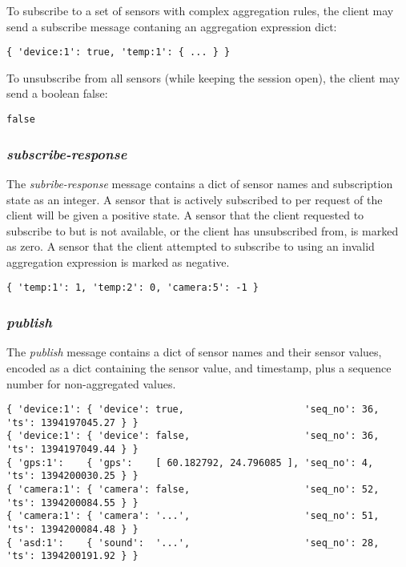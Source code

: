 \documentclass[a4paper]{article}
\begin{document}
To subscribe to a set of sensors with complex aggregation rules, the client may send a subscribe message contaning an aggregation expression dict:
\begin{verbatim}
{ 'device:1': true, 'temp:1': { ... } }
\end{verbatim}

To unsubscribe from all sensors (while keeping the session open), the client may send a boolean false:
\begin{verbatim}
false
\end{verbatim}

\subsubsection{\emph{subscribe-response}}
The \emph{subribe-response} message contains a dict of sensor names and subscription state as an integer. A sensor that is actively subscribed to per request of the client will be given a positive state. A sensor that the client requested to subscribe to but is not available, or the client has unsubscribed from, is marked as zero. A sensor that the client attempted to subscribe to using an invalid aggregation expression is marked as negative.

\begin{verbatim}
{ 'temp:1': 1, 'temp:2': 0, 'camera:5': -1 }
\end{verbatim}

\subsubsection{\emph{publish}}

The \emph{publish} message contains a dict of sensor names and their sensor values, encoded as a dict containing the sensor value, and timestamp, plus a sequence number for non-aggregated values.
\begin{verbatim}
{ 'device:1': { 'device': true,                     'seq_no': 36, 'ts': 1394197045.27 } }
{ 'device:1': { 'device': false,                    'seq_no': 36, 'ts': 1394197049.44 } }
{ 'gps:1':    { 'gps':    [ 60.182792, 24.796085 ], 'seq_no': 4,  'ts': 1394200030.25 } }
{ 'camera:1': { 'camera': false,                    'seq_no': 52, 'ts': 1394200084.55 } }
{ 'camera:1': { 'camera': '...',                    'seq_no': 51, 'ts': 1394200084.48 } }
{ 'asd:1':    { 'sound':  '...',                    'seq_no': 28, 'ts': 1394200191.92 } }
\end{verbatim}
\end{document}
